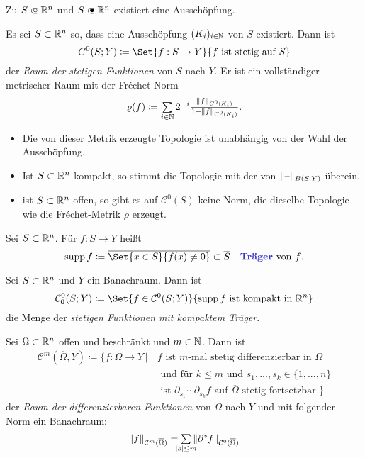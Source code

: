 \documentclass{cheat-sheet}
\begin{document}
\begin{bem}
  Zu $S \opn \R^n$ und $S \cls \R^n$ existiert eine Ausschöpfung.
\end{bem}

\begin{definition}
  Es sei $S \subset \mathbb{R}^n$ so, dass eine Ausschöpfung $(K_i)_{i \in \mathbb{N}}$ von $S$ existiert. Dann ist
  \[ C^0(S; Y) \coloneqq \Set{ f : S \to Y }{ f \text{ ist stetig auf } S } \]
  der \emph{Raum der stetigen Funktionen} von $S$ nach $Y$. Er ist ein vollständiger metrischer Raum mit der Fréchet-Norm
  \[ \varrho(f) \coloneqq \sum_{i \in \N} 2^{-i} \tfrac{ \norm{f}_{C^0(K_i)} }{ 1 + \norm{f}_{C^0(K_i)} }. \]
\end{definition}

\begin{bem}
  \begin{itemize}
    \item Die von dieser Metrik erzeugte Topologie ist unabhängig von der Wahl der Ausschöpfung.
    \item Ist $S \subset \mathbb{R}^n$ kompakt, so stimmt die Topologie mit der von $\lVert\text{--}\rVert_{B(S,Y)}$ überein.
    \item ist $S \subset \mathbb{R}^n$ offen, so gibt es auf $\mathcal{C}^0(S)$ keine Norm, die dieselbe Topologie wie die Fréchet-Metrik $\rho$ erzeugt.
  \end{itemize}
\end{bem}

\begin{definition}
  Sei $S \subset \mathbb{R}^n$. Für $f : S \to Y$ heißt
  \[ \supp f \coloneqq \overline{\Set{ x \in S }{ f(x) \not= 0 }} \subset \overline{S} \quad \text{\emph{Träger} von $f$.} \]
\end{definition}

\begin{definition}
  Sei $S \subset \mathbb{R}^n$ und $Y$ ein Banachraum. Dann ist
  \[ \mathcal{C}_0^0(S; Y) \coloneqq \Set{ f \in \mathcal{C}^0(S; Y) }{ \supp f \text{ ist kompakt in } \R^n } \]
  die Menge der \emph{stetigen Funktionen mit kompaktem Träger}. %
\end{definition}

\begin{definition}
  Sei $\Omega \subset \mathbb{R}^n$ offen und beschränkt und $m \in \mathbb{N}$. Dann ist
  \begin{align*}
    \mathcal{C}^m(\overline\Omega, Y) \coloneqq \{ f : \Omega \to Y \,|\, & f \text{ ist $m$-mal stetig differenzierbar in $\Omega$ } \\[-2pt]
    & \text{ und für $k \leq m$ und } s_1, ..., s_k \in \{ 1, ..., n \} \\[-2pt]
    & \text{ ist $\partial_{s_1} \cdots \partial_{s_k} f$ auf $\overline\Omega$ stetig fortsetzbar } \}
  \end{align*}
  der \emph{Raum der differenzierbaren Funktionen} von $\Omega$ nach $Y$ und mit folgender Norm ein Banachraum:
  \[ \norm{f}_{\mathcal{C}^m(\overline\Omega)} = \sum_{\mathclap{\abs{s} \leq m}} \, \norm{\partial^s f}_{\mathcal{C}^0(\overline\Omega)} \]
\end{definition}
\end{document}
